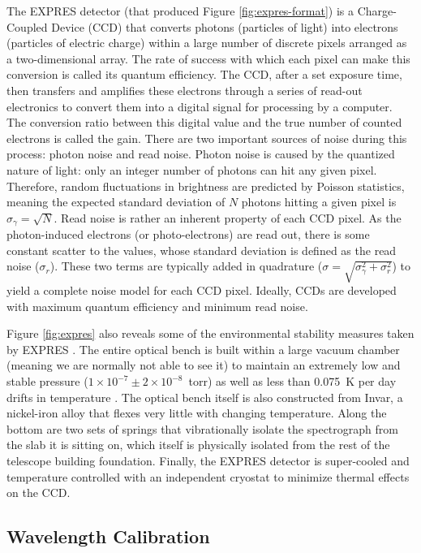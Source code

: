 The EXPRES detector (that produced Figure \ref{fig:expres-format}) is a Charge-Coupled Device (CCD) that converts photons (particles of light) into electrons (particles of electric charge) within a large number of discrete pixels arranged as a two-dimensional array. The rate of success with which each pixel can make this conversion is called its quantum efficiency. The CCD, after a set exposure time, then transfers and amplifies these electrons through a series of read-out electronics to convert them into a digital signal for processing by a computer. The conversion ratio between this digital value and the true number of counted electrons is called the gain. There are two important sources of noise during this process: photon noise and read noise. Photon noise is caused by the quantized nature of light: only an integer number of photons can hit any given pixel. Therefore, random fluctuations in brightness are predicted by Poisson statistics, meaning the expected standard deviation of $N$ photons hitting a given pixel is $\sigma_\gamma=\sqrt{N}$. Read noise is rather an inherent property of each CCD pixel. As the photon-induced electrons (or photo-electrons) are read out, there is some constant scatter to the values, whose standard deviation is defined as the read noise ($\sigma_r$). These two terms are typically added in quadrature ($\sigma=\sqrt{\sigma_\gamma^2 + \sigma_r^2}$) to yield a complete noise model for each CCD pixel. Ideally, CCDs are developed with maximum quantum efficiency and minimum read noise.

Figure \ref{fig:expres} also reveals some of the environmental stability measures taken by EXPRES \citep{jurgenson_expres_2016}. The entire optical bench is built within a large vacuum chamber (meaning we are normally not able to see it) to maintain an extremely low and stable pressure ($1\times 10^{-7} \pm 2\times 10^{-8}$~torr) as well as less than 0.075~\si{\kelvin} per day drifts in temperature \citep{blackman_performance_2020}. The optical bench itself is also constructed from Invar, a nickel-iron alloy that flexes very little with changing temperature. Along the bottom are two sets of springs that vibrationally isolate the spectrograph from the slab it is sitting on, which itself is physically isolated from the rest of the telescope building foundation. Finally, the EXPRES detector is super-cooled and temperature controlled with an independent cryostat to minimize thermal effects on the CCD.

\subsection{Wavelength Calibration} \label{intro:wvln_cal}

